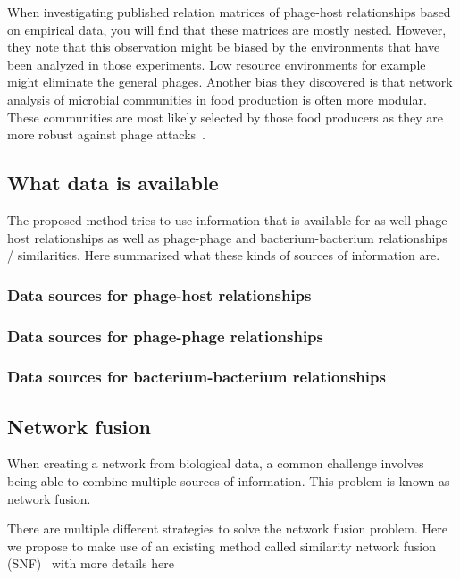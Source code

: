 \documentclass{article}
\begin{document}
When investigating published relation matrices of phage-host relationships 
based on empirical data, you will find that these matrices are mostly nested. 
However, they note that this observation might be biased by the environments
that have been analyzed in those experiments. Low resource environments for
example might eliminate the general phages. Another bias they discovered is
that network analysis of microbial communities in food production is often
more modular. These communities are most likely selected by those food producers
as they are more robust against phage attacks~\cite{weitz2013phage}.

\subsection{What data is available}

The proposed method tries to use information that is available for as well
phage-host relationships as well as phage-phage and bacterium-bacterium
relationships / similarities. Here summarized what these kinds of sources
of information are.

\subsubsection{Data sources for phage-host relationships}

\subsubsection{Data sources for phage-phage relationships}

\subsubsection{Data sources for bacterium-bacterium relationships}

\subsection{Network fusion}

When creating a network from biological data, a common challenge involves
being able to combine multiple sources of information. This problem is
known as network fusion. 

There are multiple different strategies to solve the network fusion problem. 
Here we propose to make use of an existing method called 
similarity network fusion (SNF)~\cite{wang2014similarity}
with more details here~\cite{wang2012unsupervised}
\end{document}

